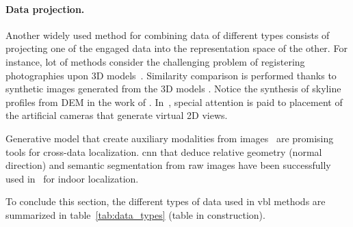 		\paragraph{Data projection.}
			Another widely used method for combining data of different types consists of projecting one of the engaged data into the representation space of the other. For instance, lot of methods consider the challenging problem of registering photographies upon 3D models~\citep{Baatz2012,Kendall2015,Arth2015,Pascoe2015,Pascoe2015a,Pascoe2015b}. Similarity comparison is performed thanks to synthetic images generated from the 3D models \citep{Russell2011,Mason2011,Aubry2014,Poglitsch2015,Taira2018,Taira2019}. Notice the synthesis of skyline profiles from DEM in the work of \citet{Baatz2012}. In~\citep{Irschara2009,Gee2012,Aubry2014,Torii2015}, special attention is paid to placement of the artificial cameras that generate virtual 2D views. 

			Generative model that create auxiliary modalities from images~\citep{Zamir2018} are promising tools for cross-data localization. \ac{cnn} that deduce relative geometry (normal direction) and semantic segmentation from raw images have been successfully used in~\citep{Taira2019} for indoor localization.

%	
	
To conclude this section, the different types of data used in \ac{vbl} methods are summarized in table~\ref{tab:data_types} (table in construction).

